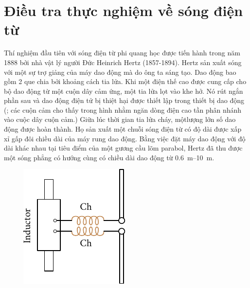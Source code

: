 \section{Điều tra thực nghiệm về sóng điện từ}\label{sec:15_3}

Thí nghiệm đầu tiên với sóng điện từ phi quang học được tiến hành trong năm 1888 bởi nhà vật lý người Đức Heinrich Hertz (1857-1894).
Hertz sản xuất sóng với một sự trợ giảng của máy dao động mà do ông ta sáng tạo.
Dao động bao gồm 2 que chia bởi khoảng cách tia lửa.
Khi một điện thế cao được cung cấp cho bộ dao động từ một cuộn dây cảm ứng, một tia lửa lọt vào khe hở.
Nó rút ngắn phần sau và dao động điện tử bị thiệt hại được thiết lập trong thiết bị dao động (; các cuộn cảm cho thấy trong hình nhằm ngăn dòng điện cao tần phân nhánh vào cuộc dây cuộn cảm.)
Giữa lúc thời gian tia lửa cháy, mộtlượng lớn số dao động  được hoàn thành.
Họ sản xuất một chuỗi sóng điện từ có độ dài được xấp xỉ gấp đôi chiều dài của máy rung dao động.
Bằng việc đặt máy dao động với độ dài khác nhau tại tiêu điểm của một gương cầu lõm parabol, Hertz đã thu được một sóng phẳng có hướng cùng có chiều dài dao động từ \SIrange{0.6}{10}{\metre}.
\begin{figure}[!htb]
	\begin{center}
		\includegraphics[scale=1]{figures/ch_15/fig_15_2.pdf}
		\caption[]{}
		\label{fig:15_2}
	\end{center}
	\vspace{-0.8cm}
\end{figure}

